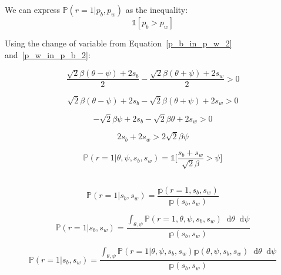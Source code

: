 \documentclass[a4paper,11pt]{article}
\theoremstyle{mytheor}
\newcommand*\diff{\mathop{}\!\mathrm{d}}
\begin{document}
\subsection{}
We can express $\mathbb{P}(r=1|p_b,p_w)$ as the inequality:
\begin{equation}
    \label{int_p_w_p_b_0}
    \mathbb{1}[p_b > p_w]
\end{equation}

Using the change of variable from Equation~\ref{p_b_in_p_w_2} and~\ref{p_w_in_p_b_2}:

\begin{equation}
    \label{int_p_w_p_b_0}
    \frac{\sqrt{2}\beta(\theta-\psi) + 2s_b}{2} - \frac{\sqrt{2}\beta(\theta+\psi) + 2s_w}{2} > 0
\end{equation}

\begin{equation}
    \label{p_w_and_p_b_in_r_2}
    \sqrt{2}\beta(\theta-\psi) + 2s_b - \sqrt{2}\beta(\theta+\psi) + 2s_w > 0
\end{equation}

\begin{equation}
    \label{p_w_and_p_b_in_r_3}
    -\sqrt{2}\beta\psi + 2s_b - \sqrt{2}\beta\theta + 2s_w > 0
\end{equation}

\begin{equation}
    \label{p_w_and_p_b_in_r_4}
    2s_b + 2s_w > 2\sqrt{2}\beta\psi
\end{equation}

\begin{equation}
    \label{p_w_and_p_b_in_r_5}
    \mathbb{P}(r=1|\theta,\psi,s_b,s_w)=\mathbb{1}\Big[\frac{s_b + s_w}{\sqrt{2}\beta} > \psi\Big]
\end{equation}

\subsection{}

\begin{equation}
    \mathbb{P}(r=1|s_b,s_w) = \frac{\mathbb{p}(r=1,s_b,s_w)}{\mathbb{p}(s_b,s_w)}
\end{equation}

\begin{equation}
    \mathbb{P}(r=1|s_b,s_w) = \frac{\int_{\theta,\psi} \mathbb{P}(r=1,\theta,\psi,s_b,s_w)\diff{\theta}\diff{\psi}}{\mathbb{p}(s_b,s_w)}
\end{equation}

\begin{equation}
    \mathbb{P}(r=1|s_b,s_w) = \frac{\int_{\theta,\psi} \mathbb{P}(r=1|\theta,\psi,s_b,s_w)\mathbb{p}(\theta,\psi,s_b,s_w)\diff{\theta}\diff{\psi}}{\mathbb{p}(s_b,s_w)}
\end{equation}
\end{document}
